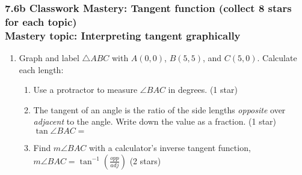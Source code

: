 \documentclass[12pt, twoside]{article}
\begin{document}
\subsubsection*{7.6b Classwork Mastery: Tangent function (collect 8 stars for each topic)\\[0.5cm]
Mastery topic: Interpreting tangent graphically}
  \begin{enumerate}
  \item Graph and label $\triangle ABC$ with $A(0,0)$, $B(5,5)$, and $C(5,0)$. Calculate each length:
    \begin{enumerate}[itemsep=1.25cm]
      \vspace{2cm}
      \item Use a protractor to measure $\angle BAC$ in degrees.  \hfill (1 star)
      \item The tangent of an angle is the ratio of the side lengths \emph{opposite} over \emph{adjacent} to the angle. Write down the value as a fraction.  \hfill (1 star)\\[0.5cm]
        $\tan \angle BAC=$
      \item Find $m\angle BAC$ with a calculator's inverse tangent function,\\ $\displaystyle m \angle BAC = \tan^{-1}(\frac{opp}{adj})$  \hfill (2 stars)
    \end{enumerate}

\newpage

\end{enumerate}
\end{document}
